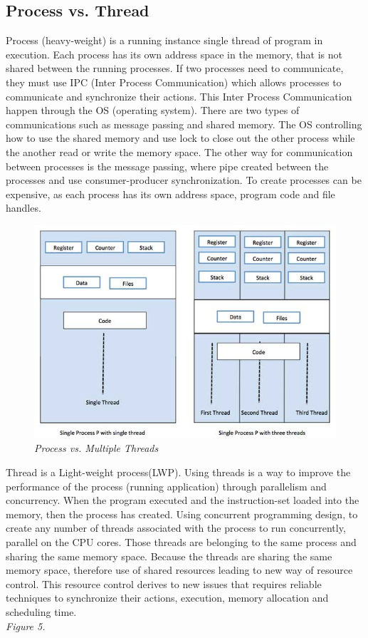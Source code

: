 \documentclass[12pt]{article}
\begin{document}
\subsection{Process vs. Thread}
Process (heavy-weight) is a running instance single thread of program in execution. Each process has its own address space in the memory, that is not shared between the running processes. If two processes need to communicate, they must use IPC (Inter Process Communication) which allows processes to communicate and synchronize their actions. This Inter Process Communication happen through the OS (operating system). There are two types of communications such as message passing and shared memory. The OS controlling how to use the shared memory and use lock to close out the other process while the another read or write the memory space. The other way for communication between processes is the message passing, where pipe created between the processes and use consumer-producer synchronization. To create processes can be expensive, as each process has its own address space, program code and file handles.\\

\begin{figure}[h!]
\centering
\includegraphics[scale=0.5]{Pictures/single_multi_thread.png}
\caption{\textit{\color{gray}Process vs. Multiple Threads \cite{Nikolay}}}
\end{figure}

Thread is a Light-weight process(LWP). Using threads is a way to improve the performance of the process (running application) through parallelism and concurrency. When the program executed and the instruction-set loaded into the memory, then the process has created. Using concurrent programming design, to create any number of threads associated with the process to run concurrently, parallel on the CPU cores. Those threads are belonging to the same process and sharing the same memory space. Because the threads are sharing the same memory space, therefore use of shared resources leading to new way of resource control. This resource control derives to new issues that requires reliable techniques to synchronize their actions, execution, memory allocation and scheduling time.\cite{Tutorialspoint}\\\textit{\color{gray}Figure 5.}\\\\
 
\end{document}
